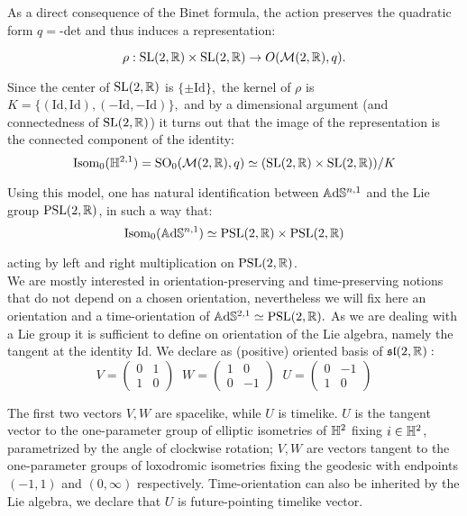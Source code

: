 As a direct consequence of the Binet formula, the action preserves the quadratic form $q=$-det and thus induces a representation: 

\[ \rho:\text{SL}(2,\mathbb{R})\times \text{SL}(2,\mathbb{R})\to O(\mathcal{M}(2,\mathbb{R}),q). \]

Since the center of $\text{SL}(2,\mathbb{R})$ is $\{\pm \text{Id}\},$ the kernel of $\rho$ is $K=\{(\text{Id},\text{Id}),(-\text{Id},-\text{Id})\},$ and by a dimensional argument (and connectedness of $\text{SL}(2,\mathbb{R})$) it turns out that the image of the representation is the connected component of the identity: 
\[
    \text{Isom}_0(\mathbb{H}^{2,1})=\text{SO}_0(\mathcal{M}(2,\mathbb{R}),q)\simeq (\text{SL}(2,\mathbb{R})\times \text{SL}(2,\mathbb{R}))/K
\]
    
Using this model, one has natural identification between $\mathbb{A}\mathrm{d}\mathbb{S}^{n,1}$ and the Lie group $\text{PSL}(2,\mathbb{R})$, in such a way that: 
\begin{equation}\label{isomiso}
    \text{Isom}_0(\mathbb{A}\mathrm{d}\mathbb{S}^{n,1})\simeq \text{PSL}(2,\mathbb{R})\times\text{PSL}(2,\mathbb{R})
\end{equation}
    
acting by left and right multiplication on $\text{PSL}(2,\mathbb{R})$.\\ We are mostly interested in orientation-preserving and time-preserving notions that do not depend on a chosen orientation, nevertheless we will fix here an orientation and a time-orientation of $\mathbb{A}\mathrm{d}\mathbb{S}^{2,1}\simeq\text{PSL}(2,\mathbb{R}).$ As we are dealing with a Lie group it is sufficient to define on orientation of the Lie algebra, namely the tangent at the identity Id. We declare as (positive) oriented basis of $\mathfrak{sl}(2,\mathbb{R}):$ 
\begin{equation}\label{tangent}
V=\begin{pmatrix}
  0 & 1 \\ 1 & 0
\end{pmatrix}\;\;
W=\begin{pmatrix}
  1 & 0 \\ 0 & -1
\end{pmatrix}
\;\;
U=\begin{pmatrix}
  0 & -1 \\ 1 & 0
\end{pmatrix}
\end{equation}

The first two vectors $V,W$ are spacelike, while $U$ is timelike. $U$ is the tangent vector to the one-parameter group of elliptic isometries of $\mathbb{H}^2$ fixing $i\in\mathbb{H}^2$, parametrized by the angle of clockwise rotation; $V,W$ are vectors tangent to the one-parameter groups of loxodromic isometries fixing the geodesic with endpoints $(-1,1)$ and $(0,\infty)$ respectively. Time-orientation can also be inherited by the Lie algebra, we declare that $U$ is future-pointing timelike vector. \\

